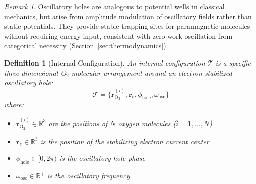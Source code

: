 \documentclass[aps,prd,twocolumn,superscriptaddress,floatfix,nofootinbib]{revtex4-2}
\newtheorem{definition}[theorem]{Definition}
\theoremstyle{remark}
\newtheorem{remark}[theorem]{Remark}
\begin{document}
\begin{remark}
Oscillatory holes are analogous to potential wells in classical mechanics, but arise from amplitude modulation of oscillatory fields rather than static potentials. They provide stable trapping sites for paramagnetic molecules without requiring energy input, consistent with zero-work oscillation from categorical necessity (Section~\ref{sec:thermodynamics}).
\end{remark}

\begin{definition}[Internal Configuration]
\label{def:thought}
An internal configuration $\mathcal{T}$ is a specific three-dimensional O$_2$ molecular arrangement around an electron-stabilized oscillatory hole:
\begin{equation}
\mathcal{T} = \{\mathbf{r}_{\text{O}_2}^{(i)}, \mathbf{r}_e, \phi_{\text{hole}}, \omega_{\text{osc}}\}
\end{equation}
where:
\begin{itemize}
\item $\mathbf{r}_{\text{O}_2}^{(i)} \in \mathbb{R}^3$ are the positions of $N$ oxygen molecules ($i = 1, \ldots, N$)
\item $\mathbf{r}_e \in \mathbb{R}^3$ is the position of the stabilizing electron current center
\item $\phi_{\text{hole}} \in [0, 2\pi)$ is the oscillatory hole phase
\item $\omega_{\text{osc}} \in \mathbb{R}^+$ is the oscillatory frequency
\end{itemize}
\end{definition}
\end{document}
